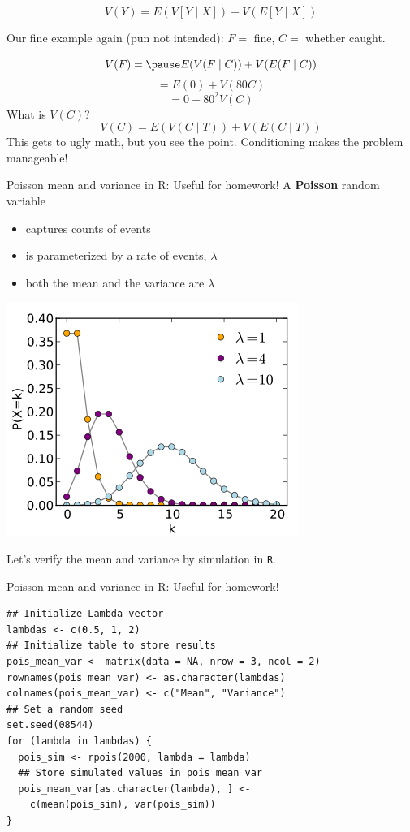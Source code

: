\documentclass{beamer}
\begin{document}
\begin{frame}
\begin{theorem}
$$V(Y)=E(V[Y\mid X])+V(E[Y\mid X])$$
\end{theorem}
Our fine example again (pun not intended): $F=$ fine, $C=$ whether caught.

$$V(F)=\pause E(V(F\mid C))+V(E(F\mid C))$$
\pause $$=E(0)+V(80C)$$
\pause $$=0+80^2V(C)$$
\pause
What is $V(C)$?
\pause
$$V(C)=E(V(C\mid T))+V(E(C\mid T))$$
This gets to ugly math, but you see the point. Conditioning makes the problem manageable!
\end{frame}

\begin{frame}{Poisson mean and variance in R: Useful for homework!}
A \textbf{Poisson} random variable
\begin{itemize}
\item captures counts of events
\item is parameterized by a rate of events, $\lambda$
\item both the mean and the variance are $\lambda$
\end{itemize}
\begin{center}\includegraphics[scale=.3]{figures/PoissonPMF.png}\end{center}

Let's verify the mean and variance by simulation in \texttt{R}.
\end{frame}

\begin{frame}[fragile]{Poisson mean and variance in R: Useful for homework!}
\begin{footnotesize}
\begin{verbatim}
## Initialize Lambda vector
lambdas <- c(0.5, 1, 2)
## Initialize table to store results
pois_mean_var <- matrix(data = NA, nrow = 3, ncol = 2)
rownames(pois_mean_var) <- as.character(lambdas)
colnames(pois_mean_var) <- c("Mean", "Variance")
## Set a random seed
set.seed(08544)
for (lambda in lambdas) {
  pois_sim <- rpois(2000, lambda = lambda)
  ## Store simulated values in pois_mean_var
  pois_mean_var[as.character(lambda), ] <- 
    c(mean(pois_sim), var(pois_sim))
}
\end{verbatim}
\end{footnotesize}
\end{frame}
\end{document}
